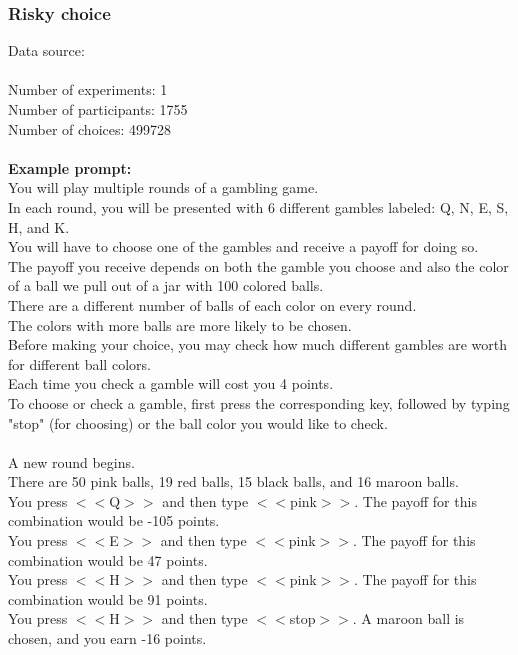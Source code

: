\documentclass[pdflatex,sn-nature]{sn-jnl}%
\theoremstyle{thmstyleone}%
\theoremstyle{thmstyletwo}%
\theoremstyle{thmstylethree}%
\begin{document}
\subsubsection*{Risky choice}
Data source: \cite{krueger2024identifying} \\ $~$ \\
Number of experiments: 1 $~$\\ 
Number of participants: 1755 $~$\\ 
Number of choices: 499728 $~$\\ 
 $~$\\ 
\textbf{Example prompt:}
 $~$\\ 
You will play multiple rounds of a gambling game. $~$\\ 
In each round, you will be presented with 6 different gambles labeled: Q, N, E, S, H, and K. $~$\\ 
You will have to choose one of the gambles and receive a payoff for doing so. $~$\\ 
The payoff you receive depends on both the gamble you choose and also the color of a ball we pull out of a jar with 100 colored balls. $~$\\ 
There are a different number of balls of each color on every round. $~$\\ 
The colors with more balls are more likely to be chosen. $~$\\ 
Before making your choice, you may check how much different gambles are worth for different ball colors. $~$\\ 
Each time you check a gamble will cost you 4 points. $~$\\ 
To choose or check a gamble, first press the corresponding key, followed by typing "stop" (for choosing) or the ball color you would like to check. $~$\\ 
 $~$\\ 
A new round begins. $~$\\ 
There are 50 pink balls, 19 red balls, 15 black balls, and 16 maroon balls. $~$\\ 
You press $<<$Q$>>$ and then type $<<$pink$>>$. The payoff for this combination would be -105 points. $~$\\ 
You press $<<$E$>>$ and then type $<<$pink$>>$. The payoff for this combination would be 47 points. $~$\\ 
You press $<<$H$>>$ and then type $<<$pink$>>$. The payoff for this combination would be 91 points. $~$\\ 
You press $<<$H$>>$ and then type $<<$stop$>>$. A maroon ball is chosen, and you earn -16 points. $~$\\ 
\end{document}
